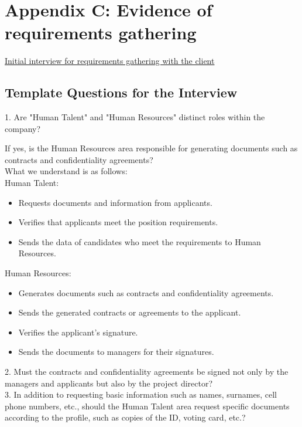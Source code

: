 \documentclass{scrreprt}
\begin{document}
\FloatBarrier 

\section{Appendix C: Evidence of requirements gathering}
\href{https://drive.google.com/file/d/1h30RbdVEBx5Qlg8GVXav69ps1Y7cQVRv/view?usp=drive_link}{Initial interview for requirements gathering with the client}
\subsection*{Template Questions for the Interview}

1. Are "Human Talent" and "Human Resources" distinct roles within the company?

    If yes, is the Human Resources area responsible for generating documents such as contracts and confidentiality agreements?\\

    What we understand is as follows:\\
    Human Talent:
    \begin{itemize}
        \item Requests documents and information from applicants.
        \item Verifies that applicants meet the position requirements.
        \item Sends the data of candidates who meet the requirements to Human Resources.
    \end{itemize}
    Human Resources:
    \begin{itemize}
        \item Generates documents such as contracts and confidentiality agreements.
        \item Sends the generated contracts or agreements to the applicant.
        \item Verifies the applicant's signature.
        \item Sends the documents to managers for their signatures.
    \end{itemize}

2. Must the contracts and confidentiality agreements be signed not only by the managers and applicants but also by the project director?\\

3. In addition to requesting basic information such as names, surnames, cell phone numbers, etc., should the Human Talent area request specific documents according to the profile, such as copies of the ID, voting card, etc.?\\
\end{document}

